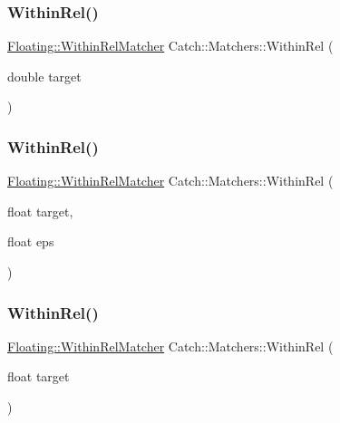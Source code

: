 \mbox{\label{namespace_catch_1_1_matchers_a46e2f1efab13b85e2cbe36958a27d518}} 
\subsubsection{\texorpdfstring{Within\+Rel()}{WithinRel()}\hspace{0.1cm}{\footnotesize\ttfamily [2/4]}}
{\footnotesize\ttfamily \mbox{\hyperlink{struct_catch_1_1_matchers_1_1_floating_1_1_within_rel_matcher}{Floating\+::\+Within\+Rel\+Matcher}} Catch\+::\+Matchers\+::\+Within\+Rel (\begin{DoxyParamCaption}\item[{double}]{target }\end{DoxyParamCaption})}

\mbox{\label{namespace_catch_1_1_matchers_a494b4c8c68ac883e29dc35da71a4cd72}} 
\subsubsection{\texorpdfstring{Within\+Rel()}{WithinRel()}\hspace{0.1cm}{\footnotesize\ttfamily [3/4]}}
{\footnotesize\ttfamily \mbox{\hyperlink{struct_catch_1_1_matchers_1_1_floating_1_1_within_rel_matcher}{Floating\+::\+Within\+Rel\+Matcher}} Catch\+::\+Matchers\+::\+Within\+Rel (\begin{DoxyParamCaption}\item[{float}]{target,  }\item[{float}]{eps }\end{DoxyParamCaption})}

\mbox{\label{namespace_catch_1_1_matchers_a18cfb571dd191377674bad0cbb50078e}} 
\subsubsection{\texorpdfstring{Within\+Rel()}{WithinRel()}\hspace{0.1cm}{\footnotesize\ttfamily [4/4]}}
{\footnotesize\ttfamily \mbox{\hyperlink{struct_catch_1_1_matchers_1_1_floating_1_1_within_rel_matcher}{Floating\+::\+Within\+Rel\+Matcher}} Catch\+::\+Matchers\+::\+Within\+Rel (\begin{DoxyParamCaption}\item[{float}]{target }\end{DoxyParamCaption})}

